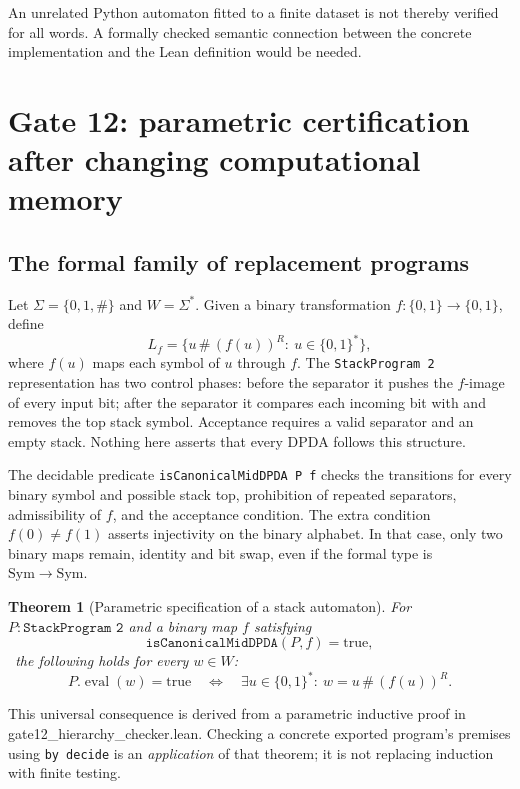 \documentclass[11pt,a4paper]{article}
\newtheorem{theorem}{Theorem}[section]
\begin{document}
An unrelated Python automaton fitted to a finite dataset is not thereby verified for all words. A formally checked semantic connection between the concrete implementation and the Lean definition would be needed.

\section{Gate 12: parametric certification after changing computational memory}

\subsection{The formal family of replacement programs}

Let $\Sigma=\{0,1,\#\}$ and $W=\Sigma^*$. Given a binary transformation $f:\{0,1\}\to\{0,1\}$, define
\begin{equation}\label{eq:mid-language}
L_f=\{u\,\#\,(f(u))^R:\ u\in\{0,1\}^*\},
\end{equation}
where $f(u)$ maps each symbol of $u$ through $f$. The \texttt{StackProgram 2} representation has two control phases: before the separator it pushes the $f$-image of every input bit; after the separator it compares each incoming bit with and removes the top stack symbol. Acceptance requires a valid separator and an empty stack. Nothing here asserts that every DPDA follows this structure.

The decidable predicate \texttt{isCanonicalMidDPDA P f} checks the transitions for every binary symbol and possible stack top, prohibition of repeated separators, admissibility of $f$, and the acceptance condition. The extra condition $f(0)\ne f(1)$ asserts injectivity on the binary alphabet. In that case, only two binary maps remain, identity and bit swap, even if the formal type is $\mathrm{Sym}\to\mathrm{Sym}$.

\begin{theorem}[Parametric specification of a stack automaton]\label{thm:dpda}
For $P:\texttt{StackProgram 2}$ and a binary map $f$ satisfying\
\[\texttt{isCanonicalMidDPDA}(P,f)=\mathrm{true},\]\
the following holds for every $w\in W$:
\begin{equation}\label{eq:dpda-sound}
P.\operatorname{eval}(w)=\mathrm{true}
\quad\Longleftrightarrow\quad
\exists u\in\{0,1\}^*:\ w=u\,\#\,(f(u))^R.
\end{equation}
\end{theorem}
This universal consequence is derived from a parametric inductive proof in {\ttfamily gate12\_\allowbreak hierarchy\_\allowbreak checker.lean}. Checking a concrete exported program's premises using \texttt{by decide} is an \emph{application} of that theorem; it is not replacing induction with finite testing.
\end{document}
